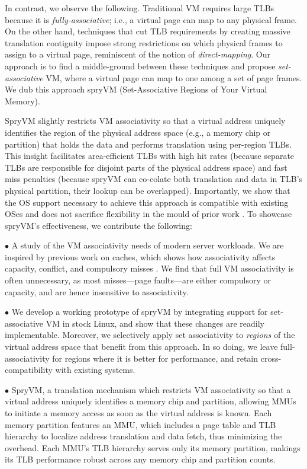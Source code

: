In contrast, we observe the following. Traditional VM requires large
TLBs because it is {\it fully-associative}; i.e., a virtual page can
map to any physical frame. On the other hand, techniques that cut TLB
requirements by creating massive translation contiguity
\cite{basu:efficient, gandhi:range, haria:devirtualizing} impose
strong restrictions on which physical frames to assign to a virtual
page, reminiscent of the notion of {\it direct-mapping}. Our approach
is to find a middle-ground between these techniques and propose {\it
  set-associative} VM, where a virtual page can map to one among a set
of page frames. We dub this approach spryVM (Set-Associative Regions
of Your Virtual Memory). 

SpryVM slightly restricts VM associativity so that a virtual address uniquely
identifies the region of the physical address space (e.g., a memory chip or  partition)
 that holds the data and performs translation using per-region TLBs. This insight
facilitates area-efficient TLBs with high hit rates (because separate
TLBs are responsible for disjoint parts of the physical address space)
and fast miss penalties (because spryVM can co-colate both translation
and data in TLB's physical partition, their lookup can be
overlapped). Importantly, we show that the OS support necessary to
achieve this approach is compatible with existing OSes and does not
sacrifice flexibility in the mould of prior work \cite{basu:efficient,
  haria:devirtualizing}. To showcase spryVM's effectiveness, we
contribute the following:

\noindent $\bullet$ A study of the VM associativity needs of modern
server workloads. We are inspired by previous work on caches, which
shows how associativity affects capacity, conflict, and compulsory
misses \cite{hill:case}.  We find that full VM associativity is often
unnecessary, as most misses---page faults---are either compulsory or
capacity, and are hence insensitive to associativity. 

\noindent $\bullet$ We develop a working prototype of spryVM by
integrating support for set-associative VM in stock Linux, and show
that these changes are readily implementable. Moreover, we selectively
apply set associativity to {\it regions} of the virtual address space
that benefit from this approach. In so doing, we leave
full-associativity for regions where it is better for performance, and
retain cross-compatibility with existing systems.

\noindent $\bullet$ SpryVM, a translation mechanism which restricts VM
associativity so that a virtual address uniquely identifies a memory
chip and partition, allowing MMUs to initiate a memory access as soon as the
virtual address is known. Each memory partition features an MMU, which
includes a page table and TLB hierarchy to localize address
translation and data fetch, thus minimizing the overhead. Each MMU's
TLB hierarchy serves only its memory partition, makings its TLB
performance robust across any memory chip and partition counts.

